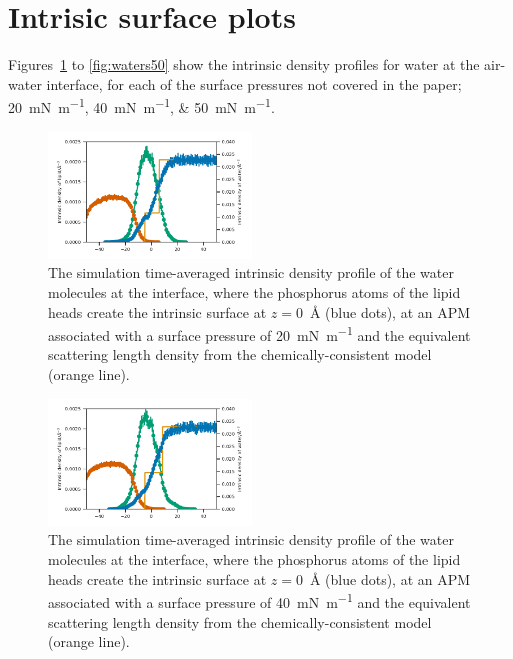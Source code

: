 \documentclass[amsmath,amssymb,superscriptaddress]{revtex4-1}
\begin{document}
\section{Intrisic surface plots}

Figures~\ref{fig:waters20} to \ref{fig:waters50} show the intrinsic density profiles for water at the air-water interface, for each of the surface pressures not covered in the paper; \SIlist{20;40;50}{\milli\newton\per\meter}.
%
\begin{figure}
\centering
  \includegraphics[width=0.48\textwidth]{water_20}
  \caption{The simulation time-averaged intrinsic density profile of the water molecules at the interface, where the phosphorus atoms of the lipid heads create the intrinsic surface at $z=$\SI{0}{\angstrom} (blue dots), at an APM associated with a surface pressure of \SI{20}{\milli\newton\per\meter} and the equivalent scattering length density from the chemically-consistent model (orange line).}
  \label{fig:waters20}
\end{figure}
%
%
\begin{figure}
\centering
  \includegraphics[width=0.48\textwidth]{water_40}
  \caption{The simulation time-averaged intrinsic density profile of the water molecules at the interface, where the phosphorus atoms of the lipid heads create the intrinsic surface at $z=$\SI{0}{\angstrom} (blue dots), at an APM associated with a surface pressure of \SI{40}{\milli\newton\per\meter} and the equivalent scattering length density from the chemically-consistent model (orange line).}
  \label{fig:waters40}
\end{figure}
%
%
\end{document}
